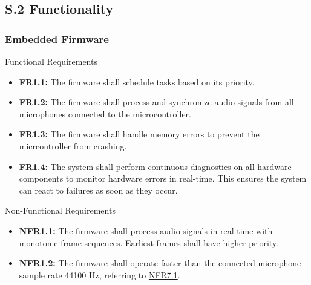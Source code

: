 \documentclass[12pt]{article}
\theoremstyle{definition}
\begin{document}
\subsection{S.2 Functionality}

\subsubsection{\hyperref[comp:embedded_firmware]{Embedded Firmware}} Functional
Requirements
\begin{itemize}
  \item \label{FR1_1}\textbf{FR1.1:} The firmware shall schedule tasks based on
  its priority.
  
  \item \label{FR1_2}\textbf{FR1.2:} The firmware shall process and synchronize
  audio signals from all microphones connected to the microcontroller.

  \item \label{FR1_3}\textbf{FR1.3:} The firmware shall handle memory errors to
  prevent the micrcontroller from crashing.

  \item \label{FR1_4}\textbf{FR1.4:} The system shall perform continuous
  diagnostics on all hardware components to monitor hardware errors in
  real-time. This ensures the system can react to failures as soon as they
  occur.
\end{itemize}

Non-Functional Requirements
\begin{itemize}
  \item \label{NFR1_1}\textbf{NFR1.1:} The firmware shall process audio signals
  in real-time with monotonic frame sequences. Earliest frames shall have higher
  priority.
  
  \item \label{NFR1_2}\textbf{NFR1.2:} The firmware shall operate faster than
  the connected microphone sample rate 44100 Hz, referring to
  \hyperref[NFR7_1]{NFR7.1}.
\end{itemize}
\end{document}
